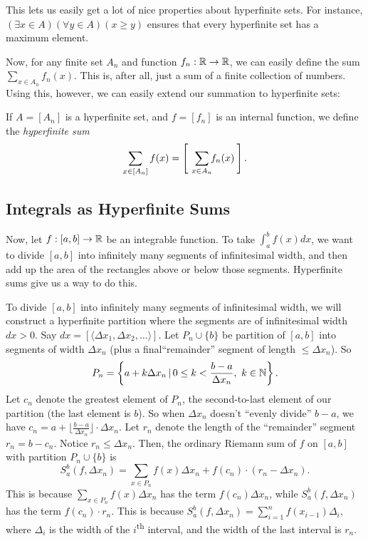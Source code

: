 This lets us easily get a lot of nice properties about hyperfinite sets. For instance, $(\exists x \in A)(\forall y \in A) (x \geq y)$ ensures that every hyperfinite set has a maximum element.

Now, for any finite set $A_n$ and function $f_n: \mathbb{R} \to \mathbb{R}$, we can easily define the sum $\sum_{x \in A_n} f_n(x)$. This is, after all, just a sum of a finite collection of numbers. Using this, however, we can easily extend our summation to hyperfinite sets:

\begin{defn}
    If $A = [A_n]$ is a hyperfinite set, and $f = [f_n]$ is an internal function, we define the \textit{hyperfinite sum}
    \[
    \sum_{x \in [A_n]} f(x) = \left[\ \ \sum_{\mathclap{x \in A_n}} f_n(x) \:\right].
    \] 
\end{defn}

\subsection{Integrals as Hyperfinite Sums}
Now, let $f: [a, b] \to \mathbb{R}$ be an integrable function. To take $\int_a^b f(x)dx$, we want to divide $[a, b]$ into infinitely many segments of infinitesimal width, and then add up the area of the rectangles above or below those segments. Hyperfinite sums give us a way to do this.

To divide $[a, b]$ into infinitely many segments of infinitesimal width, we will construct a hyperfinite partition where the segments are of infinitesimal width $dx > 0$. Say $dx = [\langle \Delta x_1, \Delta x_2, \ldots \rangle]$. Let $P_n \cup \{b\}$ be partition of $[a, b]$ into segments of width $\Delta x_n$ (plus a final``remainder'' segment of length $\leq \Delta x_n$). So
\[
P_n = \left\{a + k\Delta x_n \,|\, 0 \leq k < \frac{b-a}{\Delta x_n},\ k \in \mathbb{N}\right\}.
\]
Let $c_n$ denote the greatest element of $P_n$, the second-to-last element of our partition (the last element is $b$). So when $\Delta x_n$ doesn't ``evenly divide'' $b-a$, we have $c_n = a + \lfloor \frac{b-a}{\Delta x_n} \rfloor \cdot \Delta x_n$. Let $r_n$ denote the length of the ``remainder'' segment $r_n = b - c_n$. Notice $r_n \leq \Delta x_n$. Then, the ordinary Riemann sum of $f$ on $[a, b]$ with partition $P_n \cup \{b\}$ is 
\[ 
S_a^b(f, \Delta x_n) = \sum_{x \in P_n} f(x) \Delta x_n + f(c_n) \cdot (r_n - \Delta x_n). 
\]
This is because $\sum_{x \in P_n} f(x) \Delta x_n$ has the term $f(c_n) \Delta x_n$, while $S_a^b(f, \Delta x_n)$ has the term $f(c_n) \cdot r_n$. This is because $S_a^b(f, \Delta x_n) = \sum_{i=1}^n f(x_{i-1})\Delta_i$, where $\Delta_i$ is the width of the $i$\textsuperscript{th} interval, and the width of the last interval is $r_n$.


